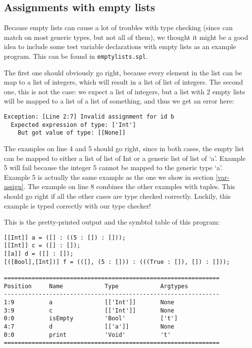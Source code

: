 \documentclass[a4paper]{article}
\begin{document}
\subsection{Assignments with empty lists}
Because empty lists can cause a lot of troubles with type checking (since can match on most generic types, but not all of them), we thought it might be a good idea to include some test variable declarations with empty lists as an example program. This can be found in {\tt emptylists.spl}. 

The first one should obviously go right, because every element in the list can be map to a list of integers, which will result in a list of list of integers. The second one, this is not the case: we expect a list of integers, but a list with 2 empty lists will be mapped to a list of a list of something, and thus we get an error here: 
\begin{verbatim}
Exception: [Line 2:7] Invalid assignment for id b
  Expected expression of type: ['Int']
    But got value of type: [[None]]
\end{verbatim}
The examples on line 4 and 5 should go right, since in both cases, the empty list can be mapped to either a list of list of Int or a generic list of list of `a'. Example 5 will fail because the integer 5 cannot be mapped to the generic type `a'. Example 5 is actually the same example as the one we show in section \ref{var-assign}. The example on line 8 combines the other examples with tuples. This should go right if all the other cases are type checked correctly. Luckily, this example is typed correctly with our type checker!

This is the pretty-printed output and the symbtol table of this program: 
\begin{verbatim}
[[Int]] a = ([] : ((5 : []) : []));
[[Int]] c = ([] : []);
[[a]] d = ([] : []);
[([Bool],[Int])] f = (([], (5 : [])) : (((True : []), []) : []));

==============================================================
Position     Name            Type            Argtypes            
--------------------------------------------------------------
1:9          a               [['Int']]       None                
3:9          c               [['Int']]       None                
0:0          isEmpty         'Bool'          ['t']               
4:7          d               [['a']]         None                
0:0          print           'Void'          't'                 
==============================================================
\end{verbatim}
\end{document}
